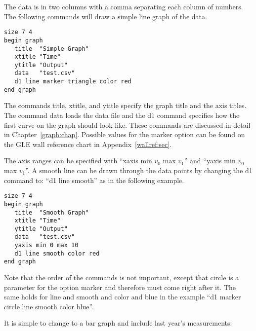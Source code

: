 
The data is in two columns with a comma separating each column of numbers. The following commands will draw a simple line graph of the data.

\preglegraph{}
\begin{minipage}[c]{8cm}
\begin{Verbatim}
size 7 4
begin graph
   title  "Simple Graph"
   xtitle "Time"
   ytitle "Output"
   data   "test.csv"
   d1 line marker triangle color red
end graph
\end{Verbatim}
\end{minipage}
\hfill
\begin{minipage}[c]{7cm}
\mbox{}
\end{minipage}
\postglegraph{}

The commands {\sf title}, {\sf xtitle}, and {\sf ytitle} specify the graph title and the axis titles. The command {\sf data} loads the data file and the {\sf d1} command specifies how the first curve on the graph should look like. These commands are discussed in detail in Chapter~\ref{graph:chap}. Possible values for the {\sf marker} option can be found on the GLE wall reference chart in Appendix~\ref{wallref:sec}.

The axis ranges can be specified with ``{\sf xaxis min $v_0$ max $v_1$}'' and ``{\sf yaxis min $v_0$ max $v_1$}''. A smooth line can be drawn through the data points by changing the d1 command to: ``{\sf d1 line smooth}'' as in the following example.

\preglegraph{}
\begin{minipage}[c]{8cm}
\begin{Verbatim}
size 7 4
begin graph
   title  "Smooth Graph"
   xtitle "Time"
   ytitle "Output"
   data   "test.csv"
   yaxis min 0 max 10
   d1 line smooth color red
end graph
\end{Verbatim}
\end{minipage}
\hfill
\begin{minipage}[c]{7cm}
\mbox{}
\end{minipage}
\postglegraph{}

Note that the order of the commands is not important, except that {\sf circle} is a parameter for the option {\sf marker} and therefore must come right after it. The same holds for line and smooth and color and blue in the example ``d1 marker circle line smooth color blue''.

It is simple to change to a bar graph and include last year's measurements:

